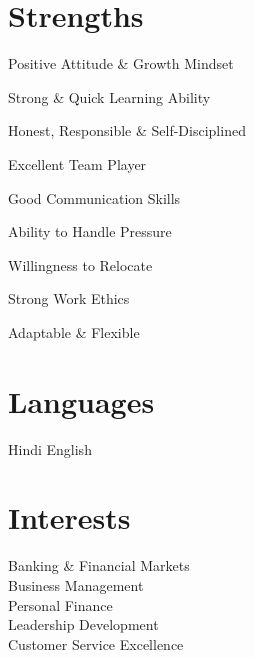 \documentclass[]{deedy-resume-openfont}
\begin{document}
\begin{minipage}[t]{0.33\textwidth}
\section{Strengths}
\begin{tightemize}
\item Positive Attitude \& Growth Mindset
\item Strong \& Quick Learning Ability
\item Honest, Responsible \& Self-Disciplined
\item Excellent Team Player
\item Good Communication Skills
\item Ability to Handle Pressure
\item Willingness to Relocate
\item Strong Work Ethics
\item Adaptable \& Flexible
\end{tightemize}
\sectionsep

\section{Languages}
Hindi 
English 
\sectionsep

\section{Interests}
Banking \& Financial Markets \\
Business Management \\
Personal Finance \\
Leadership Development \\
Customer Service Excellence
\sectionsep

\end{minipage}
\hfill
\end{document}

